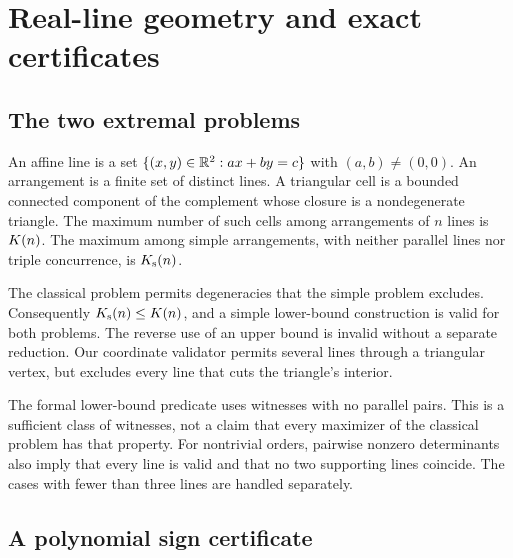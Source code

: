 \section{Real-line geometry and exact certificates}\label{sec:geometry}

\subsection{The two extremal problems}
\begin{definition}
An affine line is a set $\{(x,y)\in\mathbb{R}^2:ax+by=c\}$ with $(a,b)\ne(0,0)$. An arrangement is a finite set of distinct lines. A triangular cell is a bounded connected component of the complement whose closure is a nondegenerate triangle. The maximum number of such cells among arrangements of $n$ lines is $K(n)$. The maximum among simple arrangements, with neither parallel lines nor triple concurrence, is $K_{\mathrm{s}}(n)$.
\end{definition}

The classical problem permits degeneracies that the simple problem excludes. Consequently $K_{\mathrm{s}}(n)\le K(n)$, and a simple lower-bound construction is valid for both problems. The reverse use of an upper bound is invalid without a separate reduction. Our coordinate validator permits several lines through a triangular vertex, but excludes every line that cuts the triangle's interior.

The formal lower-bound predicate uses witnesses with no parallel pairs. This is a sufficient class of witnesses, not a claim that every maximizer of the classical problem has that property. For nontrivial orders, pairwise nonzero determinants also imply that every line is valid and that no two supporting lines coincide. The cases with fewer than three lines are handled separately.

\subsection{A polynomial sign certificate}

